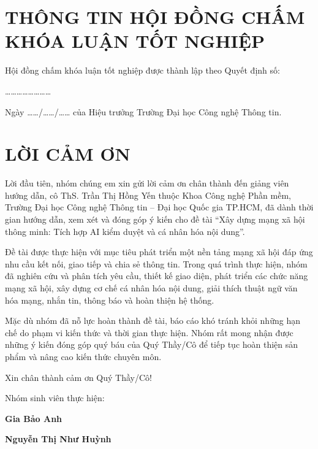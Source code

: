 ﻿\makeoutercover
\makeinnercover


\chapter*{THÔNG TIN HỘI ĐỒNG CHẤM KHÓA LUẬN TỐT NGHIỆP}

Hội đồng chấm khóa luận tốt nghiệp được thành lập theo Quyết định số:

\begin{center}
\ldots\ldots\ldots\ldots\ldots\ldots\ldots\ldots
\end{center}

Ngày \ldots\ldots/\ldots\ldots/\ldots\ldots{} của Hiệu trưởng Trường
Đại học Công nghệ Thông tin.

\clearpage
\chapter*{LỜI CẢM ƠN}

Lời đầu tiên, nhóm chúng em xin gửi lời cảm ơn chân thành đến giảng viên
hướng dẫn, cô ThS. Trần Thị Hồng Yến thuộc Khoa Công nghệ Phần mềm,
Trường Đại học Công nghệ Thông tin -- Đại học Quốc gia TP.HCM, đã dành
thời gian hướng dẫn, xem xét và đóng góp ý kiến cho đề tài ``Xây dựng
mạng xã hội thông minh: Tích hợp AI kiểm duyệt và cá nhân hóa nội dung''.

Đề tài được thực hiện với mục tiêu phát triển một nền tảng mạng xã hội
đáp ứng nhu cầu kết nối, giao tiếp và chia sẻ thông tin. Trong quá trình
thực hiện, nhóm đã nghiên cứu và phân tích yêu cầu, thiết kế giao diện,
phát triển các chức năng mạng xã hội, xây dựng cơ chế cá nhân hóa nội
dung, giải thích thuật ngữ văn hóa mạng, nhắn tin, thông báo và hoàn
thiện hệ thống.

Mặc dù nhóm đã nỗ lực hoàn thành đề tài, báo cáo khó tránh khỏi những
hạn chế do phạm vi kiến thức và thời gian thực hiện. Nhóm rất mong nhận
được những ý kiến đóng góp quý báu của Quý Thầy/Cô để tiếp tục hoàn
thiện sản phẩm và nâng cao kiến thức chuyên môn.

\vspace{1.2cm}
\begin{flushright}
Xin chân thành cảm ơn Quý Thầy/Cô!\par
\vspace{0.25cm}
Nhóm sinh viên thực hiện:\par
\vspace{1.4cm}
\textbf{Gia Bảo Anh}\par
\textbf{Nguyễn Thị Như Huỳnh}
\end{flushright}

